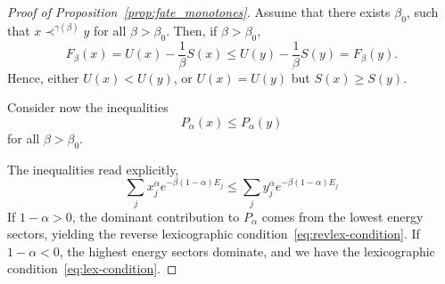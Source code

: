 \documentclass[11pt,a4paper,longbibliography]{amsart}
\numberwithin{equation}{section}
\theoremstyle{plain}
\theoremstyle{definition}
\theoremstyle{remark}
\begin{document}
			\begin{proof}[Proof of Proposition~\ref{prop:fate_monotones}]
				Assume that there exists $\beta_0$, such that $
				x\prec^{\gamma(\beta)} y$ for all $\beta>\beta_0$. Then, if $\beta>\beta_0$,
				\begin{equation}
					F_{\beta}(x)=U(x)-\frac1\beta S(x)
					\le
					U(y)-\frac1\beta S(y)=F_{\beta}(y).
				\end{equation}
				Hence, either $
				U(x)<U(y)$,
				or
				$U(x)=U(y) $ but 
				$S(x)\ge S(y)$.
				
				Consider now the inequalities
				$$
				P_\alpha(x)\le P_\alpha(y)
				$$
				for all $\beta>\beta_0$. 
				
				The inequalities read explicitly,
				\begin{equation}
					\sum_j x_j^\alpha e^{-\beta(1-\alpha)E_j}\leq  \sum_j y_j^\alpha e^{-\beta(1-\alpha)E_j}
				\end{equation}
				If $1-\alpha>0$, the dominant contribution to $P_{\alpha}$ comes from the lowest energy sectors, yielding the reverse lexicographic condition~\eqref{eq:revlex-condition}. 
				If $1-\alpha<0$, the highest energy sectors dominate, and we have the lexicographic condition~\eqref{eq:lex-condition}.
				
			\end{proof}
			
			
			
			
		
\end{document}
